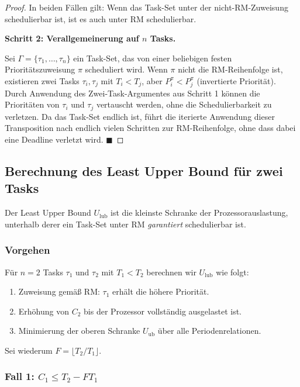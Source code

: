 ﻿\documentclass[a4paper,12pt]{report}
\theoremstyle{definition}
\begin{document}
\begin{proof}
	In beiden Fällen gilt: Wenn das Task-Set unter der nicht-RM-Zuweisung
	schedulierbar ist, ist es auch unter RM schedulierbar.

	\textbf{Schritt 2: Verallgemeinerung auf $n$ Tasks.}

	Sei $\Gamma = \{\tau_1, \ldots, \tau_n\}$ ein Task-Set, das von einer
	beliebigen festen Prioritätszuweisung $\pi$ scheduliert wird. Wenn $\pi$
	nicht die RM-Reihenfolge ist, existieren zwei Tasks $\tau_i, \tau_j$ mit
	$T_i < T_j$, aber $P_i^{\pi} < P_j^{\pi}$ (invertierte Priorität). Durch
	Anwendung des Zwei-Task-Argumentes aus Schritt 1 können die Prioritäten
	von $\tau_i$ und $\tau_j$ vertauscht werden, ohne die Schedulierbarkeit zu
	verletzen. Da das Task-Set endlich ist, führt die iterierte Anwendung dieser
	Transposition nach endlich vielen Schritten zur RM-Reihenfolge, ohne dass
	dabei eine Deadline verletzt wird. \hfill$\blacksquare$
\end{proof}

\subsection{Berechnung des Least Upper Bound für zwei Tasks}

Der Least Upper Bound $U_{\text{lub}}$ ist die kleinste Schranke der Prozessorauslastung,
unterhalb derer ein Task-Set unter RM \emph{garantiert} schedulierbar ist.

\subsubsection{Vorgehen}

Für $n = 2$ Tasks $\tau_1$ und $\tau_2$ mit $T_1 < T_2$ berechnen wir $U_{\text{lub}}$
wie folgt:
\begin{enumerate}
	\item Zuweisung gemäß RM: $\tau_1$ erhält die höhere Priorität.
	\item Erhöhung von $C_2$ bis der Prozessor vollständig ausgelastet ist.
	\item Minimierung der oberen Schranke $U_{\text{ub}}$ über alle Periodenrelationen.
\end{enumerate}

Sei wiederum $F = \lfloor T_2 / T_1 \rfloor$.

\subsubsection{Fall 1: $C_1 \leq T_2 - F T_1$}
\end{document}
